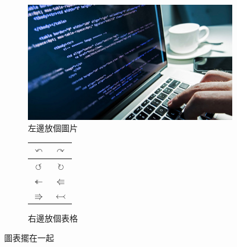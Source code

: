 \begin{figure}[hbpt]
    \centering
    \begin{subfigure}{0.4\linewidth}
        \includegraphics[width=\textwidth]{Figures/computer_science.jpg}
        \caption{左邊放個圖片}
    \end{subfigure}
    \hfill
    \begin{subfigure}{0.48\linewidth}
        \centering
        \begin{tabular}{c | c }
            $\curvearrowleft $   & $\curvearrowright $  \\
            \hline \hline
            $\circlearrowleft $  & $\circlearrowright $ \\
            $\twoheadleftarrow $ & $\Lleftarrow $       \\
            $\Rrightarrow $      & $\leftarrowtail $    \\
        \end{tabular}
        \caption{右邊放個表格}
    \end{subfigure}
    \caption{圖表擺在一起}
    \label{fig:figexample3}
\end{figure}